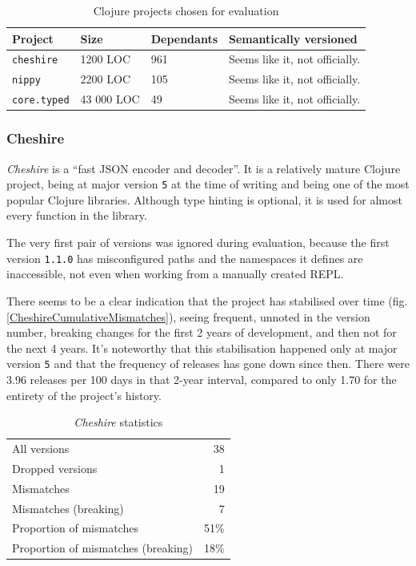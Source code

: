 \documentclass{l4proj}
\newcommand\genericstyle{\lstset{basicstyle=\ttm}}
\newcommand\codeinline[1]{{\genericstyle\lstinline!#1!}}
\begin{document}
\begin{table}[H]
\centering
\caption{Clojure projects chosen for evaluation}
\label{ClojureProjectsForEvaluation}
\begin{tabular}{|l|l|l|p{10cm}|}
\hline
\textbf{Project} & \textbf{Size} & \textbf{Dependants}
& \textbf{Semantically versioned} \\
\hline
\codeinline{cheshire} & 1200 LOC & 961 & Seems like it, not
officially. \\
\codeinline{nippy} & 2200 LOC & 105 & Seems like it, not officially. \\
\codeinline{core.typed} & 43 000 LOC & 49 & Seems like it, not
officially. \\
\hline
\end{tabular}
\end{table}

\subsubsection{Cheshire}

\textit{Cheshire} \cite{Cheshire} is a ``fast JSON encoder and
decoder''. It is a relatively mature Clojure project, being at major
version \codeinline{5} at the time of writing and being one of the
most popular Clojure libraries. Although type hinting is optional, it
is used for almost every function in the library.

The very first pair of versions was ignored during evaluation, because
the first version \codeinline{1.1.0} has misconfigured paths and the
namespaces it defines are inaccessible, not even when working from a
manually created REPL.

There seems to be a clear indication that the project has stabilised
over time (fig. \ref{CheshireCumulativeMismatches}), seeing frequent,
unnoted in the version number, breaking changes for the first 2 years
of development, and then not for the next 4 years. It's noteworthy
that this stabilisation happened only at major version \codeinline{5}
and that the frequency of releases has gone down since then. There
were 3.96 releases per 100 days in that 2-year interval, compared to
only 1.70 for the entirety of the project's history.

\begin{table}[H]
\centering
\caption{\textit{Cheshire} statistics}
\label{CheshireStats}
\begin{tabular}{|lr|}
All versions & 38 \\
Dropped versions & 1 \\
Mismatches & 19 \\
Mismatches (breaking) & 7 \\
Proportion of mismatches & 51\% \\
Proportion of mismatches (breaking) & 18\% \\
\end{tabular}
\end{table}
\end{document}
